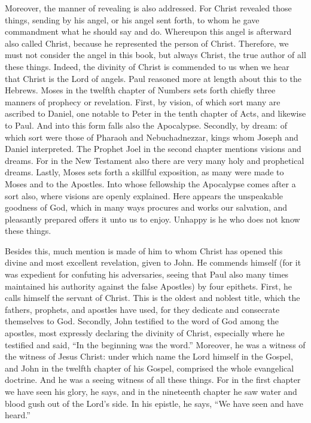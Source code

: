 Moreover, the manner of revealing is also addressed. For Christ revealed those things, sending by his angel, or his angel sent forth, to whom he gave commandment what he should say and do. Whereupon this angel is afterward also called Christ, because he represented the person of Christ. Therefore, we must not consider the angel in this book, but always Christ, the true author of all these things. Indeed, the divinity of Christ is commended to us when we hear that Christ is the Lord of angels. Paul reasoned more at length about this to the Hebrews. Moses in the twelfth chapter of Numbers sets forth chiefly three manners of prophecy or revelation. First, by vision, of which sort many are ascribed to Daniel, one notable to Peter in the tenth chapter of Acts, and likewise to Paul. And into this form falls also the Apocalypse. Secondly, by dream: of which sort were those of Pharaoh and Nebuchadnezzar, kings whom Joseph and Daniel interpreted. The Prophet Joel in the second chapter mentions visions and dreams. For in the New Testament also there are very many holy and prophetical dreams. Lastly, Moses sets forth a skillful exposition, as many were made to Moses and to the Apostles. Into whose fellowship the Apocalypse comes after a sort also, where visions are openly explained. Here appears the unspeakable goodness of God, which in many ways procures and works our salvation, and pleasantly prepared offers it unto us to enjoy. Unhappy is he who does not know these things.

Besides this, much mention is made of him to whom Christ has opened this divine and most excellent revelation, given to John. He commends himself (for it was expedient for confuting his adversaries, seeing that Paul also many times maintained his authority against the false Apostles) by four epithets. First, he calls himself the servant of Christ. This is the oldest and noblest title, which the fathers, prophets, and apostles have used, for they dedicate and consecrate themselves to God. Secondly, John testified to the word of God among the apostles, most expressly declaring the divinity of Christ, especially where he testified and said, “In the beginning was the word.” Moreover, he was a witness of the witness of Jesus Christ: under which name the Lord himself in the Gospel, and John in the twelfth chapter of his Gospel, comprised the whole evangelical doctrine. And he was a seeing witness of all these things. For in the first chapter we have seen his glory, he says, and in the nineteenth chapter he saw water and blood gush out of the Lord’s side. In his epistle, he says, “We have seen and have heard.”

